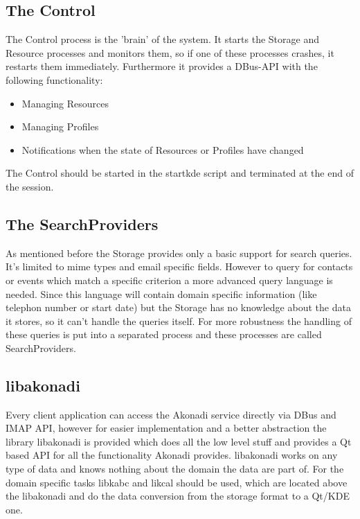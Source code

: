 \documentclass[]{report}
\begin{document}
\subsection{The Control}
The Control process is the 'brain' of the system. It starts the Storage and Resource
processes and monitors them, so if one of these processes crashes, it restarts them immediately.
Furthermore it provides a DBus-API with the following functionality:

\begin{itemize}
  \item Managing Resources
  \item Managing Profiles
  \item Notifications when the state of Resources or Profiles have changed
\end{itemize}

The Control should be started in the startkde script and terminated at the end of the session.

\subsection{The SearchProviders}
As mentioned before the Storage provides only a basic support for search queries. It's limited
to mime types and email specific fields. However to query for contacts or events which match
a specific criterion a more advanced query language is needed. Since this language will contain
domain specific information (like telephon number or start date) but the Storage has no knowledge
about the data it stores, so it can't handle the queries itself.
For more robustness the handling of these queries is put into a separated process and these processes
are called SearchProviders.

\subsection{libakonadi}
Every client application can access the Akonadi service directly via DBus and IMAP API, however
for easier implementation and a better abstraction the library libakonadi is provided which does
all the low level stuff and provides a Qt based API for all the functionality Akonadi provides.
libakonadi works on any type of data and knows nothing about the domain the data are part of.
For the domain specific tasks libkabc and likcal should be used, which are located above the
libakonadi and do the data conversion from the storage format to a Qt/KDE one.
\end{document}
